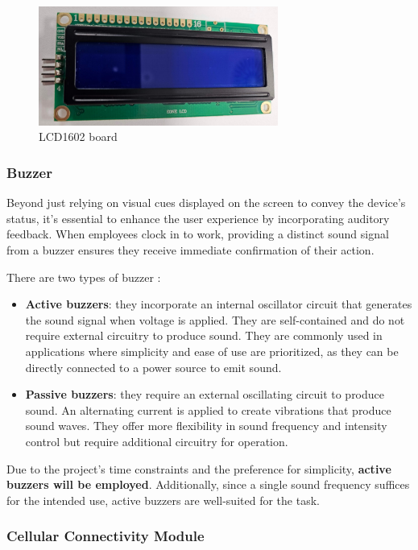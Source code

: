 \begin{figure}[h]
	\centering
	\includegraphics[width = 0.7\textwidth]{Imagenes/Vectorial/LCD1602.pdf}
	\caption{LCD1602 board}
	\label{fig:lcd1602}
\end{figure}


\subsubsection*{Buzzer}

Beyond just relying on visual cues displayed on the screen to convey the device's status, it's essential to enhance 
the user experience by incorporating auditory feedback. When employees clock in to work, providing a distinct sound 
signal from a buzzer ensures they receive immediate confirmation of their action.

There are two types of buzzer \cite{buzzers_active_vs_passive}:
\begin{itemize}
	\item \textbf{Active buzzers}: they incorporate an internal oscillator circuit that generates the sound signal 
	when voltage is applied. They are self-contained and do not require external circuitry to produce sound. They 
	are commonly used in applications where simplicity and ease of use are prioritized, as they can be directly 
	connected to a power source to emit sound.
	\item \textbf{Passive buzzers}: they require an external oscillating circuit to produce sound. An alternating 
	current is applied to create vibrations that produce sound waves. They offer more flexibility in sound frequency 
	and intensity control but require additional circuitry for operation.
\end{itemize}

Due to the project's time constraints and the preference for simplicity, \textbf{active buzzers will be employed}. 
Additionally, since a single sound frequency suffices for the intended use, active buzzers are well-suited for the task.


\subsubsection*{Cellular Connectivity Module}

